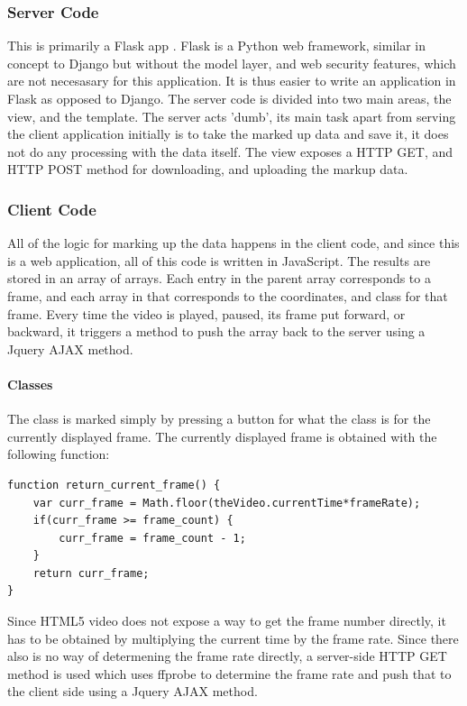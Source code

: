         \subsubsection{Server Code}
        This is primarily a Flask app \cite{flaskpocoo}. Flask is a Python web framework, similar in concept to Django but without the model layer, and web security features, which are not necesasary for this application. It is thus easier to write an application in Flask as opposed to Django. The server code is divided into two main areas, the view, and the template. The server acts 'dumb', its main task apart from serving the client application initially is to take the marked up data and save it, it does not do any processing with the data itself. The view exposes a HTTP GET, and HTTP POST method for downloading, and uploading the markup data.

        \subsubsection{Client Code}
        All of the logic for marking up the data happens in the client code, and since this is a web application, all of this code is written in JavaScript. The results are stored in an array of arrays. Each entry in the parent array corresponds to a frame, and each array in that corresponds to the coordinates, and class for that frame. Every time the video is played, paused, its frame put forward, or backward, it triggers a method to push the array back to the server using a Jquery AJAX method.

            \paragraph{Classes}
            The class is marked simply by pressing a button for what the class is for the currently displayed frame. The currently displayed frame is obtained with the following function:
                \begin{lstlisting}[style=JSStyle]
function return_current_frame() {
    var curr_frame = Math.floor(theVideo.currentTime*frameRate);
    if(curr_frame >= frame_count) {
        curr_frame = frame_count - 1;
    }
    return curr_frame;
}\end{lstlisting} 
            Since HTML5 video does not expose a way to get the frame number directly, it has to be obtained by multiplying the current time by the frame rate. Since there also is no way of determening the frame rate directly, a server-side HTTP GET method is used which uses ffprobe to determine the frame rate and push that to the client side using a Jquery AJAX method.

